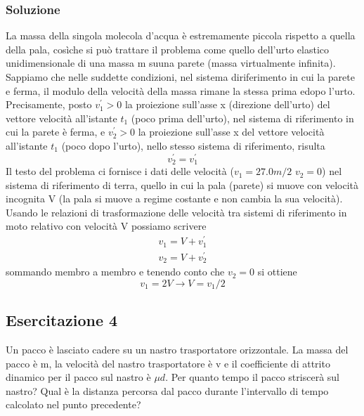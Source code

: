 \subsubsection{Soluzione}
La massa della singola molecola d’acqua è estremamente piccola rispetto a quella della pala, cosìche si può trattare il problema come quello dell’urto elastico unidimensionale di una massa m suuna parete (massa virtualmente infinita). Sappiamo che nelle suddette condizioni, nel sistema diriferimento in cui la parete e ferma, il modulo della velocità della massa rimane la stessa prima edopo l’urto. Precisamente, posto $v^\prime_1>0$  la proiezione sull’asse x (direzione dell’urto) del vettore velocità all’istante  $t_1$  (poco prima dell’urto), nel sistema di riferimento in cui la parete è ferma, e $v^\prime_2>0$  la proiezione sull’asse x del vettore velocità all’istante $t_1$ (poco dopo l'urto), nello stesso sistema di riferimento, risulta
\begin{equation*}
	v^\prime_2=v^\prime_1
\end{equation*}
Il testo del problema ci fornisce i dati delle velocità ($v_1=27.0m/2$ $v_2=0$) nel sistema di riferimento di terra, quello in cui la pala (parete) si muove con velocità incognita V (la pala si muove a regime costante e non cambia la sua velocità). Usando le relazioni di trasformazione delle velocità  tra sistemi di riferimento in moto relativo con velocità V possiamo scrivere
\begin{eqnarray*}
	v_1=V+v^\prime_1\\
	v_2=V+v^\prime_2
\end{eqnarray*}
sommando membro a membro e tenendo conto che $v_2=0$ si ottiene 
\begin{equation*}
	v_1=2V\to V=v_1/2
\end{equation*}
\subsection{Esercitazione 4}
Un pacco è lasciato cadere su un nastro trasportatore orizzontale. La massa del pacco è m, la velocità del nastro trasportatore è v e il coefficiente di attrito dinamico per il pacco sul nastro è $\mu d$. Per quanto tempo il pacco striscerà sul nastro? Qual è la distanza percorsa dal pacco durante l'intervallo di tempo calcolato nel punto precedente?
